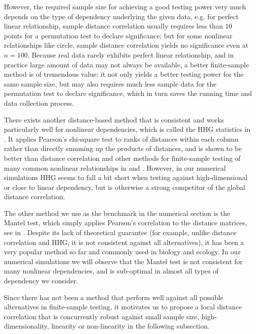 \documentclass[12pt]{article}
\begin{document}
However, the required sample size for achieving a good testing power very much depends on the type of dependency underlying the given data, e.g. for perfect linear relationship, sample distance correlation usually requires less than $10$ points for a permutation test to declare significance; but for some nonlinear relationships like circle, sample distance correlation yields no significance even at $n=100$. Because real data rarely exhibits perfect linear relationship, and in practice large amount of data may not always be available, a better finite-sample method is of tremendous value: it not only yields a better testing power for the same sample size, but may also requires much less sample data for the permutation test to declare significance, which in turn saves the running time and data collection process. 

There exists another distance-based method that is consistent and works particularly well for nonlinear dependencies, which is called the HHG statistics in \cite{HellerGorfine2013}. It applies Pearson's chi-square test to ranks of distances within each column rather than directly summing up the products of distances, and is shown to be better than distance correlation and other methods for finite-sample testing of many common nonlinear relationships in \cite{GorfineHellerHeller2012} and \cite{HellerGorfine2013}. However, in our numerical simulations HHG seems to fall a bit short when testing against high-dimensional or close to linear dependency, but is otherwise a strong competitor of the global distance correlation. 

The other method we use as the benchmark in the numerical section is the Mantel test, which simply applies Pearson's correlation to the distance matrices, see in \cite{Mantel1967}. Despite its lack of theoretical guarantee (for example, unlike distance correlation and HHG, it is not consistent against all alternatives), it has been a very popular method so far and commonly used in biology and ecology. In our numerical simulations we will observe that the Mantel test is not consistent for many nonlinear dependencies, and is sub-optimal in almost all types of dependency we consider.

Since there has not been a method that perform well against all possible alternatives in finite-sample testing, it motivates us to propose a local distance correlation that is concurrently robust against small sample size, high-dimensionality, linearity or non-linearity in the following subsection.
\end{document}
